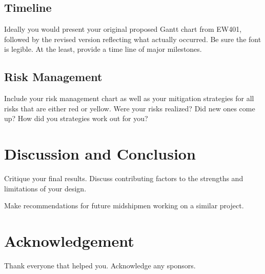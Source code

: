 \documentclass{wrcecapstone}
\begin{document}
\subsection{Timeline}
Ideally you would present your original proposed Gantt chart from EW401, followed by the revised version reflecting what actually occurred.   Be sure the font is legible.  At the least, provide a time line of major milestones.

\subsection{Risk Management}
Include your risk management chart as well as your mitigation strategies for all risks that are either red or yellow.  Were your risks realized?  Did new ones come up?  How did you strategies work out for you?





\section{Discussion and Conclusion}
Critique your final results. Discuss contributing factors to the strengths and limitations of your design. 

Make recommendations for future midshipmen working on a similar project.




\section*{Acknowledgement}
Thank everyone that helped you. Acknowledge any sponsors. 

\nocite{*}


%
\end{document}
